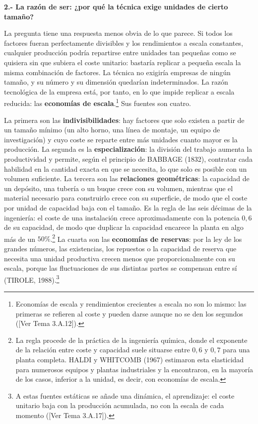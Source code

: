 \documentclass[10pt,a4paper]{article}
\newcommand{\authorfont}[1]{{\fontfamily{EBGaramond-TLF}\selectfont #1}}
\begin{document}
\textbf{2.- La razón de ser: ¿por qué la técnica exige unidades de cierto tamaño?}

La pregunta tiene una respuesta menos obvia de lo que parece. Si todos los factores fueran perfectamente divisibles y los rendimientos a escala constantes, cualquier producción podría repartirse entre unidades tan pequeñas como se quisiera sin que subiera el coste unitario: bastaría replicar a pequeña escala la misma combinación de factores. La técnica no exigiría empresas de ningún tamaño, y su número y su dimensión quedarían indeterminados. La razón tecnológica de la empresa está, por tanto, en lo que impide replicar a escala reducida: las \textbf{economías de escala}.\footnote{%
    Economías de escala y rendimientos crecientes a escala no son lo mismo: las primeras se refieren al coste y pueden darse aunque no se den los segundos ([\authorfont{Ver Tema 3.A.12}]).
} Sus fuentes son cuatro. 

La primera son las \textbf{indivisibilidades}: hay factores que solo existen a partir de un tamaño mínimo (un alto horno, una línea de montaje, un equipo de investigación) y cuyo coste se reparte entre más unidades cuanto mayor es la producción. La segunda es la \textbf{especialización}: la división del trabajo aumenta la productividad y permite, según el principio de BABBAGE (1832), contratar cada habilidad en la cantidad exacta en que se necesita, lo que solo es posible con un volumen suficiente. La tercera son las \textbf{relaciones geométricas}: la capacidad de un depósito, una tubería o un buque crece con su volumen, mientras que el material necesario para construirlo crece con su superficie, de modo que el coste por unidad de capacidad baja con el tamaño. Es la regla de las seis décimas de la ingeniería: el coste de una instalación crece aproximadamente con la potencia $0,6$ de su capacidad, de modo que duplicar la capacidad encarece la planta en algo más de un $50\%$.\footnote{%
    La regla procede de la práctica de la ingeniería química, donde el exponente de la relación entre coste y capacidad suele situarse entre $0,6$ y $0,7$ para una planta completa. HALDI y WHITCOMB (1967) estimaron esta elasticidad para numerosos equipos y plantas industriales y la encontraron, en la mayoría de los casos, inferior a la unidad, es decir, con economías de escala.
} La cuarta son las \textbf{economías de reservas}: por la ley de los grandes números, las existencias, los repuestos o la capacidad de reserva que necesita una unidad productiva crecen menos que proporcionalmente con su escala, porque las fluctuaciones de sus distintas partes se compensan entre sí (TIROLE, 1988).\footnote{%
    A estas fuentes estáticas se añade una dinámica, el aprendizaje: el coste unitario baja con la producción acumulada, no con la escala de cada momento ([\authorfont{Ver Tema 3.A.17}]).
}
\end{document}
